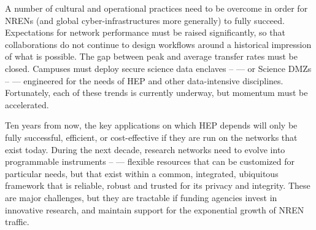 A number of cultural and operational practices need to be overcome in order for NRENs (and global cyber-infrastructures more generally) to fully succeed. 
Expectations for network performance must be raised significantly, so that collaborations do not continue to design workflows around a historical impression of what is possible. 
The gap between peak and average transfer rates must be closed. 
Campuses must deploy secure science data enclaves – --- or  Science DMZs \cite{DMZ} – --- engineered for the needs of HEP and other data-intensive disciplines.  Fortunately, each of these trends is currently underway, but momentum must be accelerated.   

Ten years from now, the key applications on which HEP depends will only be fully successful, efficient, or cost-effective if they are run on the networks that exist today. 
During the next decade, research networks need to evolve into programmable instruments – --- flexible resources that can be customized for particular needs, but that exist within a common, integrated, ubiquitous framework that is reliable, robust and trusted for its privacy and integrity. These are major challenges, but they are tractable if funding agencies invest in innovative research, and maintain support for the exponential growth of NREN traffic. 

